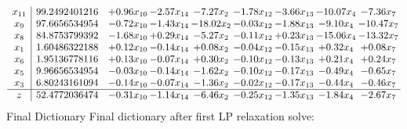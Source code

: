 \documentclass[8pt]{article}
\begin{document}
 \[\begin{array}{c| c c@{\hskip 2pt} c@{\hskip 2pt} c@{\hskip 2pt} c@{\hskip 2pt} c@{\hskip 2pt} c@{\hskip 2pt} c@{\hskip 2pt} }
 x_{11}   &  99.2492401216 & +  0.96 x_{10} & -2.57 x_{14} & -7.27 x_{2} & -1.78 x_{12} & -3.66 x_{13} & -10.07 x_{4} & -7.36 x_{7}\\
 x_{9}   &  97.6656534954 & -0.72 x_{10} & -1.43 x_{14} & -18.02 x_{2} & -0.03 x_{12} & -1.88 x_{13} & -9.10 x_{4} & -10.47 x_{7}\\
 x_{8}   &  84.8753799392 & -1.68 x_{10} & +  0.29 x_{14} & -5.27 x_{2} & -0.11 x_{12} & +  0.23 x_{13} & -15.06 x_{4} & -13.32 x_{7}\\
 x_{1}   &  1.60486322188 & +  0.12 x_{10} & -0.14 x_{14} & +  0.08 x_{2} & -0.04 x_{12} & -0.15 x_{13} & +  0.32 x_{4} & +  0.08 x_{7}\\
 x_{6}   &  1.95136778116 & +  0.13 x_{10} & -0.07 x_{14} & +  0.30 x_{2} & -0.10 x_{12} & -0.13 x_{13} & +  0.21 x_{4} & +  0.24 x_{7}\\
 x_{5}   &  9.96656534954 & -0.03 x_{10} & -0.14 x_{14} & -1.62 x_{2} & -0.10 x_{12} & -0.17 x_{13} & -0.49 x_{4} & -0.65 x_{7}\\
 x_{3}   &  6.80243161094 & -0.14 x_{10} & -0.07 x_{14} & -1.36 x_{2} & -0.02 x_{12} & -0.17 x_{13} & -0.44 x_{4} & -0.46 x_{7}\\
\hline
z    &  52.4772036474 & -0.31 x_{10} & -1.14 x_{14} & -6.46 x_{2} & -0.25 x_{12} & -1.35 x_{13} & -1.84 x_{4} & -2.67 x_{7}\\
\end{array}\]
Final Dictionary
Final dictionary after first LP relaxation solve: 
\end{document}
